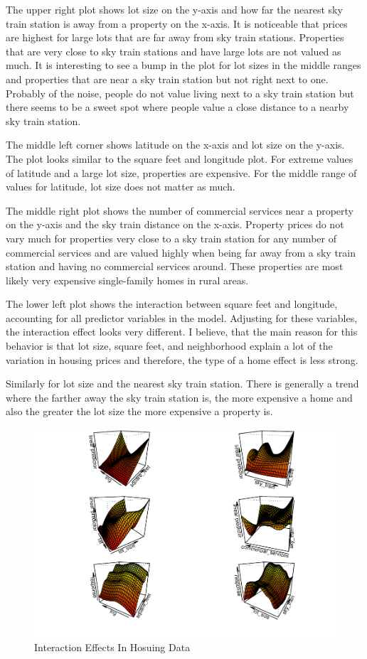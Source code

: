 \documentclass[
]{article}
\begin{document}
The upper right plot shows lot size on the y-axis and how far the
nearest sky train station is away from a property on the x-axis. It is
noticeable that prices are highest for large lots that are far away from
sky train stations. Properties that are very close to sky train stations
and have large lots are not valued as much. It is interesting to see a
bump in the plot for lot sizes in the middle ranges and properties that
are near a sky train station but not right next to one. Probably of the
noise, people do not value living next to a sky train station but there
seems to be a sweet spot where people value a close distance to a nearby
sky train station.

The middle left corner shows latitude on the x-axis and lot size on the
y-axis. The plot looks similar to the square feet and longitude plot.
For extreme values of latitude and a large lot size, properties are
expensive. For the middle range of values for latitude, lot size does
not matter as much.

The middle right plot shows the number of commercial services near a
property on the y-axis and the sky train distance on the x-axis.
Property prices do not vary much for properties very close to a sky
train station for any number of commercial services and are valued
highly when being far away from a sky train station and having no
commercial services around. These properties are most likely very
expensive single-family homes in rural areas.

The lower left plot shows the interaction between square feet and
longitude, accounting for all predictor variables in the model.
Adjusting for these variables, the interaction effect looks very
different. I believe, that the main reason for this behavior is that lot
size, square feet, and neighborhood explain a lot of the variation in
housing prices and therefore, the type of a home effect is less strong.

Similarly for lot size and the nearest sky train station. There is
generally a trend where the farther away the sky train station is, the
more expensive a home and also the greater the lot size the more
expensive a property is.

\begin{figure}
\centering
\includegraphics{final_report_files/figure-latex/unnamed-chunk-16-1.pdf}
\caption{Interaction Effects In Hosuing Data}
\end{figure}
\end{document}
